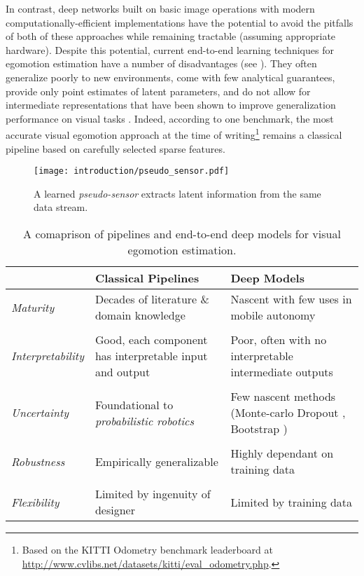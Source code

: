 In contrast, deep networks built on basic image operations with modern computationally-efficient implementations have the potential to avoid the pitfalls of both of these approaches while remaining tractable (assuming appropriate hardware). Despite this potential, current end-to-end learning techniques for egomotion estimation have a number of disadvantages (see ). They often generalize poorly to new environments, come with few analytical guarantees, provide only point estimates of latent parameters, and do not allow for intermediate representations that have been shown to improve generalization performance on visual tasks \citep{Zhou2019-se}. Indeed, according to one benchmark, the most accurate visual egomotion approach at the time of writing\footnote{Based on the KITTI Odometry benchmark leaderboard at \url{http://www.cvlibs.net/datasets/kitti/eval_odometry.php}.} remains a classical pipeline based on carefully selected sparse features.

\begin{figure}
\begin{center}
		\texttt{[image: introduction/pseudo\_sensor.pdf]}
		\caption{A learned \textit{pseudo-sensor} extracts latent information from the same data stream.}
  	\label{fig:intro_pseudo_sensor}
\end{center}
\end{figure}


\begin{table}[h!]
	\caption{A comaprison of pipelines and end-to-end deep models for visual egomotion estimation.}
	\begin{threeparttable}
	\begin{tabular}{m{}m{}m{}}
		\toprule
		& \textbf{Classical Pipelines} & \textbf{Deep Models} \\ \midrule  
		\textit{Maturity} & Decades of literature \& domain knowledge & Nascent with few uses in mobile autonomy \\
		& & \\
		\textit{Interpretability} & Good, each component has interpretable input and output & Poor, often with no interpretable intermediate outputs \\
		& & \\
		\textit{Uncertainty} & Foundational to \textit{probabilistic robotics} & Few nascent methods (Monte-carlo Dropout \citep{Gal2016-ny}, Bootstrap \citep{Osband2016})  \\
		& & \\
		\textit{Robustness} & Empirically generalizable \citep{Zhou2019-se} & Highly dependant on training data\\
		& & \\
		\textit{Flexibility} & Limited by ingenuity of designer & Limited by training data \\
		\bottomrule
	\end{tabular}
\end{threeparttable}
\label{tab:intro_classical_vs_deep}
\end{table}

